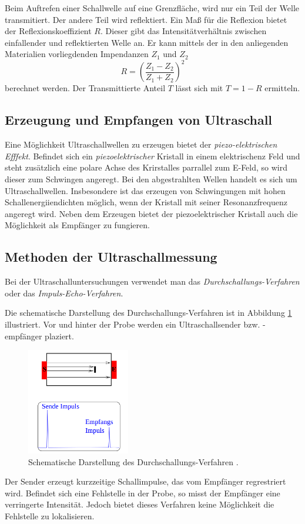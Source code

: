 Beim Auftrefen einer Schallwelle auf eine Grenzfläche, wird nur ein Teil der
Welle transmitiert. Der andere Teil wird reflektiert.
Ein Maß für die Reflexion bietet der Reflexionskoeffizient $R$.
Dieser gibt das Intensitätverhältnis zwischen einfallender und reflektierten Welle an.
Er kann mittels der in den anliegenden Materialien vorliegdenden Impendanzen $Z_1$ und $Z_2$
\begin{equation*}
  R=\left(\frac{Z_1-Z_2}{Z_1+Z_2}\right)^2
\end{equation*}
berechnet werden.
Der Transmittierte Anteil $T$ lässt sich mit $T=1-R$ ermitteln.

\subsection{Erzeugung und Empfangen von Ultraschall}

Eine Möglichkeit Ultraschallwellen zu erzeugen bietet der \emph{piezo-elektrischen Efffekt}.
Befindet sich ein \emph{piezoelektrischer} Kristall in einem elektrischenz Feld und steht
zusätzlich eine polare Achse des Krirstalles parrallel zum E-Feld, so wird dieser
zum Schwingen angeregt. Bei den abgestrahlten Wellen handelt es sich um Ultraschallwellen.
Insbesondere ist das erzeugen von Schwingungen mit hohen Schallenergiiendichten möglich,
wenn der Kristall mit seiner Resonanzfrequenz angeregt wird.
Neben dem Erzeugen bietet der piezoelektrischer Kristall auch die Möglichkeit
als Empfänger zu fungieren.

\subsection{Methoden der Ultraschallmessung}
Bei der Ultraschalluntersuchungen verwendet man das \emph{Durchschallungs-Verfahren} oder
das \emph{Impuls-Echo-Verfahren}.

Die schematische Darstellung des Durchschallungs-Verfahren ist in Abbildung
\ref{fig: durch} illustriert. Vor und hinter der Probe werden ein Ultraschallsender bzw. -empfänger
plaziert.
\begin{figure}[h]
  \centering
  \includegraphics[width=0.4\textwidth]{pics/durchsall.png}
  \caption{Schematische Darstellung des Durchschallungs-Verfahren \cite{anleitungus1}.}
  \label{fig: durch}
  \end{figure}
Der Sender erzeugt kurzzeitige Schallimpulse, das vom Empfänger
regrestriert wird. Befindet sich eine Fehlstelle in der Probe, so misst der Empfänger
eine verringerte Intensität. Jedoch bietet dieses Verfahren keine Möglichkeit die
Fehlstelle zu lokalisieren.



